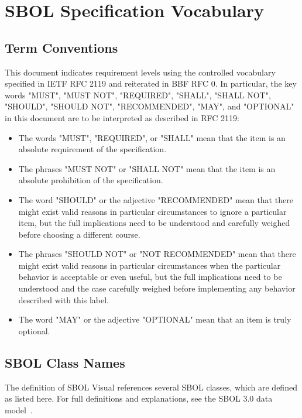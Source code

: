 \section{SBOL Specification Vocabulary}

\subsection{Term Conventions}

This document indicates requirement levels using the controlled vocabulary specified in IETF RFC 2119 and reiterated in BBF RFC 0.
In particular, the key words "MUST", "MUST NOT", "REQUIRED", "SHALL", "SHALL NOT", "SHOULD", "SHOULD NOT", "RECOMMENDED", "MAY", and "OPTIONAL" in this document are to be interpreted as described in RFC 2119:

\begin{itemize}
\item The words "MUST", "REQUIRED", or "SHALL" mean that the item is an absolute requirement of the specification.
\item The phrases "MUST NOT" or "SHALL NOT" mean that the item is an absolute prohibition of the specification.
\item The word "SHOULD" or the adjective "RECOMMENDED" mean that there might exist valid reasons in particular circumstances to ignore a particular item, but the full implications need to be understood and carefully weighed before choosing a different course.
\item The phrases "SHOULD NOT" or "NOT RECOMMENDED" mean that there might exist valid reasons in particular circumstances when the particular behavior is acceptable or even useful, but the full implications need to be understood and the case carefully weighed before implementing any behavior described with this label.
\item The word "MAY" or the adjective "OPTIONAL" mean that an item is truly optional.
\end{itemize}

\subsection{SBOL Class Names}

The definition of SBOL Visual references several SBOL classes, which are defined as listed here.  For full definitions and explanations, see the SBOL 3.0 data model~\citep{SBOL3_0}.

